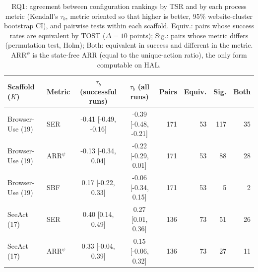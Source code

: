 \begin{table}[t]
\centering
\caption{RQ1: agreement between configuration rankings by TSR and by each process metric (Kendall's $\tau_b$,
metric oriented so that higher is better, 95\% website-cluster bootstrap CI), and pairwise tests within each
scaffold. Equiv.: pairs whose success rates are equivalent by TOST ($\Delta = 10$ points); Sig.: pairs whose
metric differs (permutation test, Holm); Both: equivalent in success and different in the metric. ARR$^{\psi}$ is
the state-free ARR (equal to the unique-action ratio), the only form computable on HAL.}
\label{tab:rq1}
\footnotesize
\begin{tabular}{@{}llccrrrr@{}}
\toprule
Scaffold ($K$) & Metric & $\tau_b$ (successful runs) & $\tau_b$ (all runs) & Pairs & Equiv. & Sig. & Both \\
\midrule
Browser-Use (19) & SER & -0.41 [-0.49, -0.16] & -0.39 [-0.48, -0.21] & 171 & 53 & 117 & 35 \\
Browser-Use (19) & ARR$^{\psi}$ & -0.13 [-0.34, 0.04] & -0.22 [-0.29, 0.01] & 171 & 53 & 88 & 28 \\
Browser-Use (19) & SBF & 0.17 [-0.22, 0.33] & -0.06 [-0.34, 0.15] & 171 & 53 & 5 & 2 \\
SeeAct (17) & SER & 0.40 [0.14, 0.49] & 0.27 [0.01, 0.36] & 136 & 73 & 51 & 26 \\
SeeAct (17) & ARR$^{\psi}$ & 0.33 [-0.04, 0.39] & 0.15 [-0.06, 0.32] & 136 & 73 & 27 & 11 \\
\bottomrule
\end{tabular}
\end{table}
